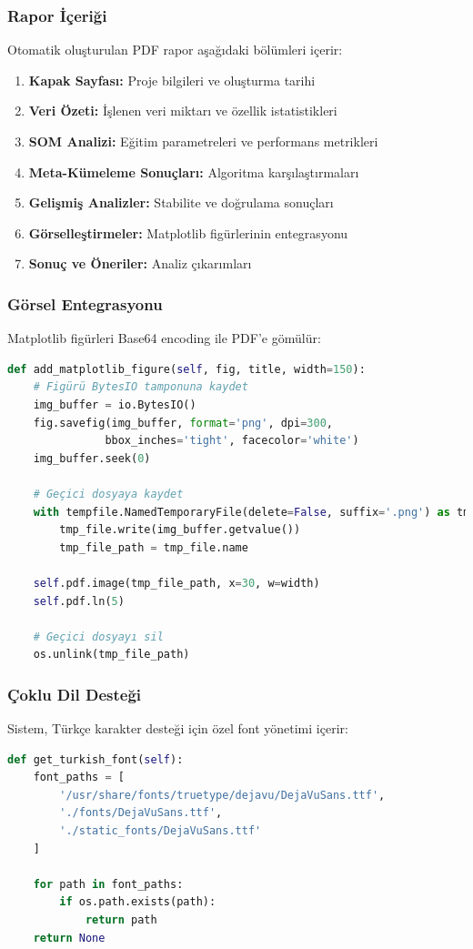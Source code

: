 \subsubsection{Rapor İçeriği}

Otomatik oluşturulan PDF rapor aşağıdaki bölümleri içerir:

\begin{enumerate}
    \item \textbf{Kapak Sayfası:} Proje bilgileri ve oluşturma tarihi
    \item \textbf{Veri Özeti:} İşlenen veri miktarı ve özellik istatistikleri
    \item \textbf{SOM Analizi:} Eğitim parametreleri ve performans metrikleri
    \item \textbf{Meta-Kümeleme Sonuçları:} Algoritma karşılaştırmaları
    \item \textbf{Gelişmiş Analizler:} Stabilite ve doğrulama sonuçları
    \item \textbf{Görselleştirmeler:} Matplotlib figürlerinin entegrasyonu
    \item \textbf{Sonuç ve Öneriler:} Analiz çıkarımları
\end{enumerate}

\newpage

\subsubsection{Görsel Entegrasyonu}

Matplotlib figürleri Base64 encoding ile PDF'e gömülür:

\begin{lstlisting}[language=python]
def add_matplotlib_figure(self, fig, title, width=150):
    # Figürü BytesIO tamponuna kaydet
    img_buffer = io.BytesIO()
    fig.savefig(img_buffer, format='png', dpi=300,
               bbox_inches='tight', facecolor='white')
    img_buffer.seek(0)

    # Geçici dosyaya kaydet
    with tempfile.NamedTemporaryFile(delete=False, suffix='.png') as tmp_file:
        tmp_file.write(img_buffer.getvalue())
        tmp_file_path = tmp_file.name
    
    self.pdf.image(tmp_file_path, x=30, w=width)
    self.pdf.ln(5)
    
    # Geçici dosyayı sil
    os.unlink(tmp_file_path)
\end{lstlisting}

\subsubsection{Çoklu Dil Desteği}

Sistem, Türkçe karakter desteği için özel font yönetimi içerir:

\begin{lstlisting}[language=python]
def get_turkish_font(self):
    font_paths = [
        '/usr/share/fonts/truetype/dejavu/DejaVuSans.ttf',
        './fonts/DejaVuSans.ttf',
        './static_fonts/DejaVuSans.ttf'
    ]
    
    for path in font_paths:
        if os.path.exists(path):
            return path
    return None
\end{lstlisting}
